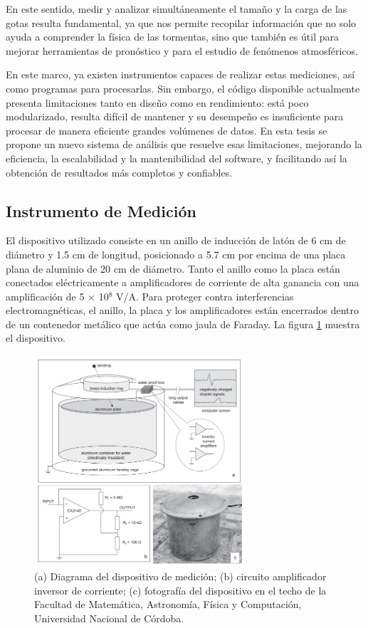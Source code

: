 \documentclass[12pt,a4paper]{article}
\begin{document}
En este sentido, medir y analizar simultáneamente el tamaño y la carga de las gotas resulta fundamental, ya que nos permite recopilar información que no solo ayuda a comprender la física de las tormentas, sino que también es útil para mejorar herramientas de pronóstico y para el estudio de fenómenos atmosféricos.

En este marco, ya existen instrumentos capaces de realizar estas mediciones, así como programas para procesarlas. Sin embargo, el código disponible actualmente presenta limitaciones tanto en diseño como en rendimiento: está poco modularizado, resulta difícil de mantener y su desempeño es insuficiente para procesar de manera eficiente grandes volúmenes de datos. En esta tesis se propone un nuevo sistema de análisis que resuelve esas limitaciones, mejorando la eficiencia, la escalabilidad y la mantenibilidad del software, y facilitando así la obtención de resultados más completos y confiables.

\subsection{Instrumento de Medición}
\lhead{}

El dispositivo utilizado consiste en un anillo de inducción de latón de 6 cm de diámetro y 1.5 cm de longitud, posicionado a 5.7 cm por encima de una placa plana de aluminio de 20 cm de diámetro. Tanto el anillo como la placa están conectados eléctricamente a amplificadores de corriente de alta ganancia con una amplificación de 5 $\times$ 10$^8$ V/A. Para proteger contra interferencias electromagnéticas, el anillo, la placa y los amplificadores están encerrados dentro de un contenedor metálico que actúa como jaula de Faraday. La figura \ref{fig:instrumento_medicion} muestra el dispositivo.

\begin{figure}[!hb]
    \centering
    \includegraphics[width=0.7\textwidth]{figures/instrumento_de_medicion.png}
    \caption{(a) Diagrama del dispositivo de medición; (b) circuito amplificador inversor de corriente; (c) fotografía del dispositivo en el techo de la Facultad de Matemática, Astronomía, Física y Computación, Universidad Nacional de Córdoba.}
    \label{fig:instrumento_medicion}
\end{figure}
\end{document}
